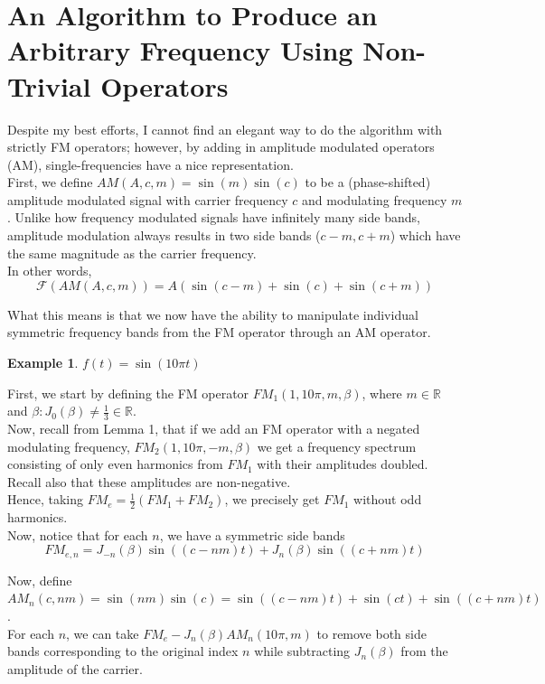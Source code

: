 \documentclass[11pt,twoside]{report}
\newtheorem{example}[thm]{Example}
\numberwithin{thm}{section}
\numberwithin{equation}{section}
\begin{document}
\section{An Algorithm to Produce an Arbitrary Frequency Using Non-Trivial Operators}
 Despite my best efforts, I cannot find an elegant way to do the algorithm with strictly FM operators; however, by adding in amplitude modulated operators (AM), single-frequencies have a nice representation.\\

First, we define $AM(A, c, m) = \sin(m)\sin(c)$ to be a (phase-shifted) amplitude modulated signal with carrier frequency $c$ and modulating frequency $m$. Unlike how frequency modulated signals have infinitely many side bands, amplitude modulation always results in two side bands ($c-m, c+m$) which have the same magnitude as the carrier frequency. \\

In other words,
$$\mathcal{F}(AM(A, c, m)) = A(\sin(c - m) + \sin(c) + \sin(c + m))$$

What this means is that we now have the ability to manipulate individual symmetric frequency bands from the FM operator through an AM operator.

\begin{example} $f(t) = \sin(10\pi t)$
\end{example}

First, we start by defining the FM operator $FM_1(1,10\pi, m, \beta)$, where $m \in \mathbb{R}$ and $\beta : J_0(\beta) \neq \frac{1}{3} \in \mathbb{R}$.\\

Now, recall from Lemma 1, that if we add an FM operator with a negated modulating frequency, $FM_2(1, 10\pi, -m, \beta)$ we get a frequency spectrum consisting of only even harmonics from $FM_1$ with their amplitudes doubled. Recall also that these amplitudes are non-negative. \\

Hence, taking $FM_e = \frac{1}{2}(FM_1 + FM_2)$, we precisely get $FM_1$ without odd harmonics.\\

Now, notice that for each $n$, we have a symmetric side bands $$FM_{e,n} = J_{-n}(\beta)\sin((c - nm)t) + J_{n}(\beta)\sin((c+nm)t)$$

Now, define $AM_n(c, nm) = \sin(nm)\sin(c) = \sin((c - nm)t) + \sin(ct) + \sin((c+nm)t)$.\\

For each $n$, we can take $FM_e - J_n(\beta)AM_n(10\pi, m)$ to remove both side bands corresponding to the original index $n$ while subtracting $J_n(\beta)$ from the amplitude of the carrier. \\
\end{document}
